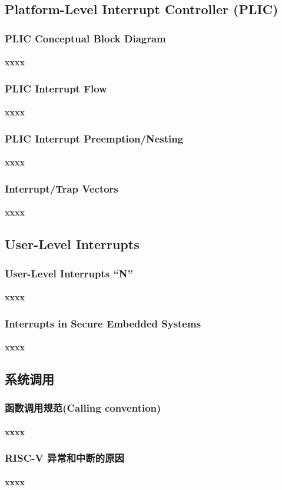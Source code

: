 \subsection{Platform-Level Interrupt Controller (PLIC)} 
\begin{frame}
	\frametitle{PLIC Conceptual Block Diagram}
	\framesubtitle{xxxx}
\end{frame}
\begin{frame}
	\frametitle{PLIC Interrupt Flow}
	\framesubtitle{xxxx}
\end{frame}
\begin{frame}
	\frametitle{PLIC Interrupt Preemption/Nesting}
	\framesubtitle{xxxx}
\end{frame}
% 
\begin{frame}
	\frametitle{Interrupt/Trap Vectors}
	\framesubtitle{xxxx}
\end{frame}

\subsection{User-Level Interrupts}
\begin{frame}
	\frametitle{User-Level Interrupts “N”}
	\framesubtitle{xxxx}
\end{frame}
\begin{frame}
	\frametitle{Interrupts in Secure Embedded Systems}
	\framesubtitle{xxxx}
\end{frame}
\subsection{系统调用}
\begin{frame}
	\frametitle{函数调用规范(Calling convention)}
	\framesubtitle{xxxx}
\end{frame}
% 
\begin{frame}
	\frametitle{RISC-V 异常和中断的原因}
	\framesubtitle{xxxx}
\end{frame}

